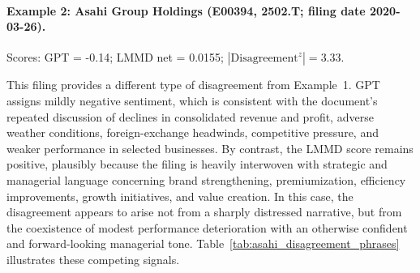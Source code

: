 \paragraph{Example 2: Asahi Group Holdings (E00394, 2502.T; filing date 2020-03-26).}
Scores: GPT = -0.14; LMMD net = 0.0155;
$|\mathrm{Disagreement}^{z}| = 3.33$.

This filing provides a different type of disagreement from Example~1. GPT assigns
mildly negative sentiment, which is consistent with the document's repeated
discussion of declines in consolidated revenue and profit, adverse weather
conditions, foreign-exchange headwinds, competitive pressure, and weaker
performance in selected businesses. By contrast, the LMMD score remains
positive, plausibly because the filing is heavily interwoven with strategic and
managerial language concerning brand strengthening, premiumization, efficiency
improvements, growth initiatives, and value creation. In this case, the
disagreement appears to arise not from a sharply distressed narrative, but from
the coexistence of modest performance deterioration with an otherwise confident
and forward-looking managerial tone. Table~\ref{tab:asahi_disagreement_phrases} illustrates these competing signals.

